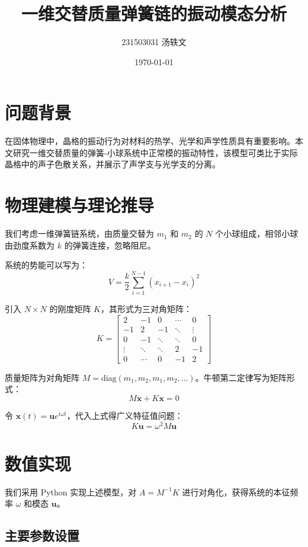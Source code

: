 \documentclass[12pt]{article}
\title{一维交替质量弹簧链的振动模态分析}
\author{231503031 汤轶文}
\date{\today}
\begin{document}
\maketitle

\section{问题背景}

在固体物理中，晶格的振动行为对材料的热学、光学和声学性质具有重要影响。本文研究一维交替质量的弹簧-小球系统中正常模的振动特性，该模型可类比于实际晶格中的声子色散关系，并展示了声学支与光学支的分离。

\section{物理建模与理论推导}

我们考虑一维弹簧链系统，由质量交替为 $m_1$ 和 $m_2$ 的 $N$ 个小球组成，相邻小球由劲度系数为 $k$ 的弹簧连接，忽略阻尼。

系统的势能可以写为：
\[
V = \frac{k}{2} \sum_{i=1}^{N-1} (x_{i+1} - x_i)^2
\]

引入 $N \times N$ 的刚度矩阵 $K$，其形式为三对角矩阵：
\[
K = \begin{bmatrix}
2 & -1 & 0 & \cdots & 0 \\
-1 & 2 & -1 & \ddots & \vdots \\
0 & -1 & \ddots & \ddots & 0 \\
\vdots & \ddots & \ddots & 2 & -1 \\
0 & \cdots & 0 & -1 & 2
\end{bmatrix}
\]

质量矩阵为对角矩阵 $M = \text{diag}(m_1, m_2, m_1, m_2, \dots)$。牛顿第二定律写为矩阵形式：
\[
M \ddot{\bm{x}} + K \bm{x} = 0
\]

令 $\bm{x}(t) = \bm{u} e^{i \omega t}$，代入上式得广义特征值问题：
\[
K \bm{u} = \omega^2 M \bm{u}
\]

\section{数值实现}

我们采用 Python 实现上述模型，对 $A = M^{-1}K$ 进行对角化，获得系统的本征频率 $\omega$ 和模态 $\bm{u}$。

\subsection*{主要参数设置}
\end{document}
